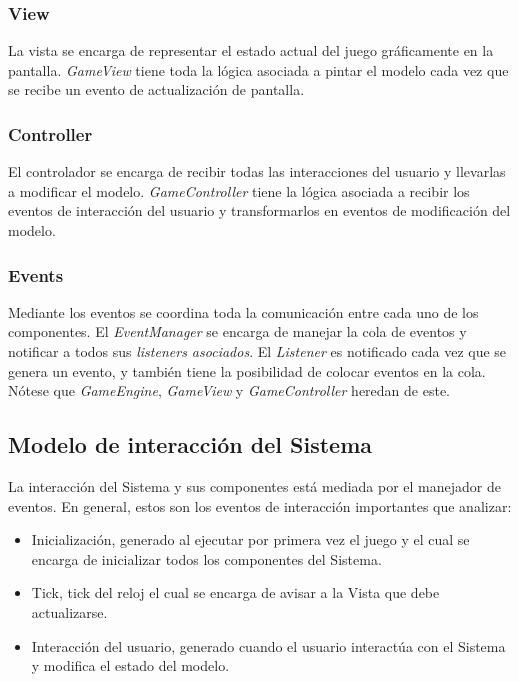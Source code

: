 \documentclass[letter,12pt]{article}
\begin{document}
\subsubsection{View} \label{diseño:arquitectura:view}

La vista se encarga de representar el estado actual del juego gráficamente en la pantalla. \textit{GameView} tiene toda la lógica asociada a pintar el modelo cada vez que se recibe un evento de actualización de pantalla. \par

\subsubsection{Controller} \label{diseño:arquitectura:controller}

El controlador se encarga de recibir todas las interacciones del usuario y llevarlas a modificar el modelo. \textit{GameController} tiene la lógica asociada a recibir los eventos de interacción del usuario y transformarlos en eventos de modificación del modelo. \par

\subsubsection{Events} \label{diseño:arquitectura:events}

Mediante los eventos se coordina toda la comunicación entre cada uno de los componentes. El \textit{EventManager} se encarga de manejar la cola de eventos y notificar a todos sus \textit{listeners asociados}. El \textit{Listener} es notificado cada vez que se genera un evento, y también tiene la posibilidad de colocar eventos en la cola. Nótese que \textit{GameEngine}, \textit{GameView} y \textit{GameController} heredan de este. \par

\subsection{Modelo de interacción del Sistema} \label{diseño:interaccion}

La interacción del Sistema y sus componentes está mediada por el manejador de eventos. En general, estos son los eventos de interacción importantes que analizar: \par

\begin{itemize}
    \item Inicialización, generado al ejecutar por primera vez el juego y el cual se encarga de inicializar todos los componentes del Sistema. 
    \item Tick, tick del reloj el cual se encarga de avisar a la Vista que debe actualizarse.
    \item Interacción del usuario, generado cuando el usuario interactúa con el Sistema y modifica el estado del modelo.
\end{itemize}
\end{document}

